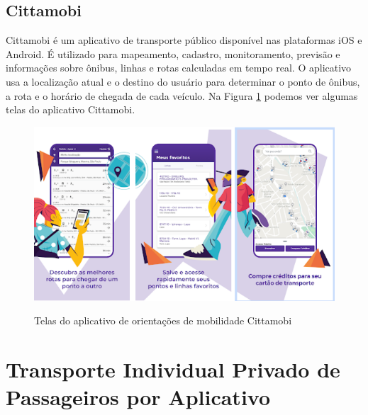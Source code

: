 \subsection{Cittamobi}
Cittamobi é um aplicativo de transporte público disponível nas plataformas iOS e Android. É utilizado para mapeamento, cadastro, monitoramento, previsão e informações sobre ônibus, linhas e rotas calculadas em tempo real. O aplicativo usa a localização atual e o destino do usuário para determinar o ponto de ônibus, a rota e o horário de chegada de cada veículo. Na Figura \ref{fig:cittamobi} podemos ver algumas telas do aplicativo Cittamobi.

\begin{figure}[!hbtp]
	\centering
	\caption{Telas do aplicativo de orientações de mobilidade Cittamobi}
	\includegraphics[width=0.6	\textwidth]{./04-figuras/cittamobi/cittamobi.png}
	\label{fig:cittamobi}
\end{figure}




\section{Transporte Individual Privado de Passageiros por Aplicativo}

